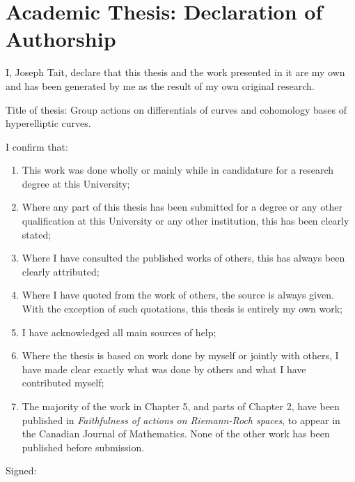 \documentclass[hidelinks]{ecsthesis}      %
\begin{document}
\chapter*{\Large \textbf{Academic Thesis: Declaration of Authorship}} 
I, Joseph Tait, declare that this thesis and the work presented in it are my own and has been generated by me as the result of my own original research.

Title of thesis: Group actions on differentials of curves and cohomology bases of hyperelliptic curves.

I confirm that:
    \begin{enumerate}
    \item This work was done wholly or mainly while in candidature for a research degree at this University;
    \item Where any part of this thesis has been submitted for a degree or any other qualification at this University or any other institution, this has been clearly stated;
    \item Where I have consulted the published works of others, this has always been clearly attributed;
    \item Where I have quoted from the work of others, the source is always given. With the exception of such quotations, this thesis is entirely my own work;
    \item I have acknowledged all main sources of help;
    \item Where the thesis is based on work done by myself or jointly with others, I have made clear exactly what was done by others and what I have contributed myself;
    \item The majority of the work in Chapter 5, and parts of Chapter 2, have been published in \emph{Faithfulness of actions on Riemann-Roch spaces}, to appear in the Canadian Journal of Mathematics. None of the other work has been published before submission.
    \end{enumerate}

Signed:\\
\end{document}
